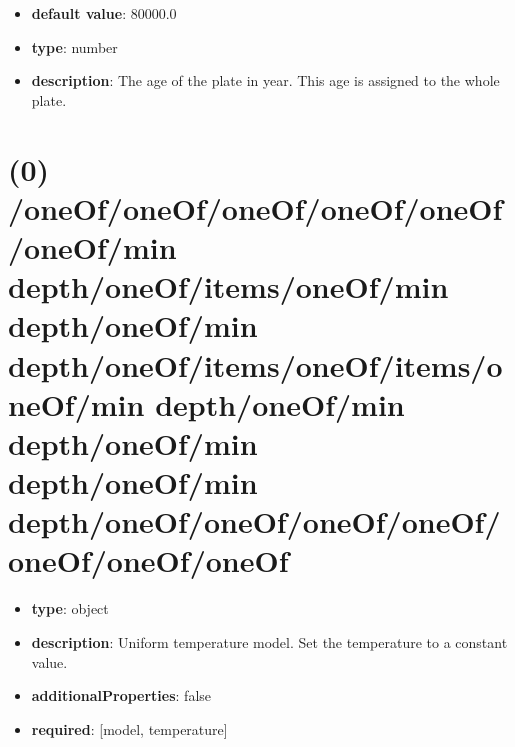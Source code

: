 \begin{itemize}[leftmargin=0em]\item {\bf default value}: 80000.0
\item {\bf type}: number
\item {\bf description}: The age of the plate in year. This age is assigned to the whole plate. 
\end{itemize}\section{(0) /oneOf/oneOf/oneOf/oneOf/oneOf/oneOf/min depth/oneOf/items/oneOf/min depth/oneOf/min depth/oneOf/items/oneOf/items/oneOf/min depth/oneOf/min depth/oneOf/min depth/oneOf/min depth/oneOf/oneOf/oneOf/oneOf/oneOf/oneOf/oneOf}
\begin{itemize}[leftmargin=0em]\item {\bf type}: object
\item {\bf description}: Uniform temperature model. Set the temperature to a constant value.
\item {\bf additionalProperties}: false
\item {\bf required}: [model, temperature]\end{itemize}
